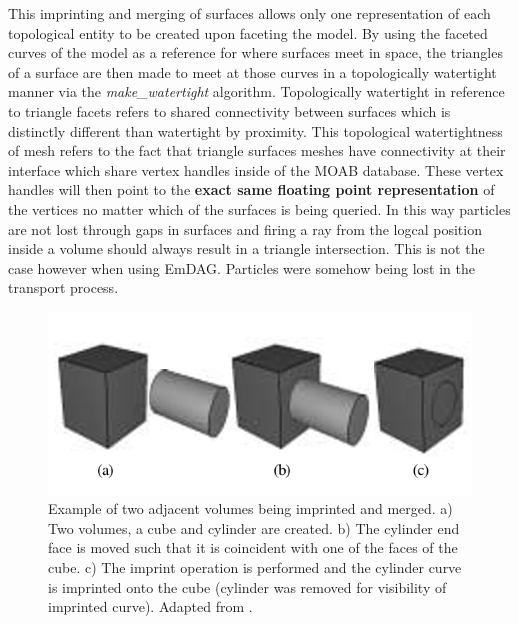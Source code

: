 \documentclass[12pt, a4paper]{article}
\begin{document}
This imprinting and merging of surfaces allows only one representation of each topological entity to be created upon faceting the model. By using the faceted curves of the model as a reference for where surfaces meet in space, the triangles of a surface are then made to meet at those curves in a topologically watertight manner via the \textit{make\_watertight} algorithm. Topologically watertight in reference to triangle facets refers to shared connectivity between surfaces which is distinctly different than watertight by proximity. This topological watertightness of mesh refers to the fact that triangle surfaces meshes have connectivity at their interface which share vertex handles inside of the MOAB database. These vertex handles will then point to the \textbf{exact same floating point representation} of the vertices no matter which of the surfaces is being queried. In this way particles are not lost through gaps in surfaces and firing a ray from the logcal position inside a volume should always result in a triangle intersection. This is not the case however when using EmDAG. Particles were somehow being lost in the transport process.

\begin{figure}[H]
  \centering
  \includegraphics[scale=0.5]{imprint_ex.png}
  \caption{Example of two adjacent volumes being imprinted and merged. a) Two volumes, a cube and cylinder are created. b) The cylinder end face is moved such that it is coincident with one of the faces of the cube. c) The imprint operation is performed and the cylinder curve is imprinted onto the cube (cylinder was removed for visibility of imprinted curve). Adapted from \cite{White_2002}.}
  \label{imprint_ex}
\end{figure}
\end{document}
